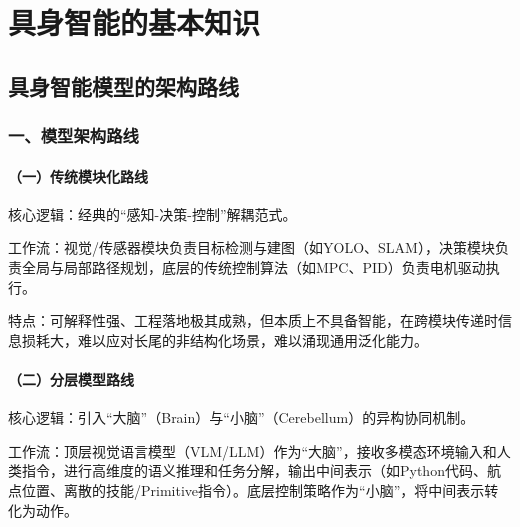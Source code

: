 \hypertarget{ux5177ux8eabux667aux80fdux7684ux57faux672cux77e5ux8bc6}{%
\chapter{具身智能的基本知识}\label{ux5177ux8eabux667aux80fdux7684ux57faux672cux77e5ux8bc6}}

\hypertarget{ux5177ux8eabux667aux80fdux6a21ux578bux7684ux67b6ux6784ux8defux7ebf}{%
\section{具身智能模型的架构路线}\label{ux5177ux8eabux667aux80fdux6a21ux578bux7684ux67b6ux6784ux8defux7ebf}}

\hypertarget{ux4e00ux6a21ux578bux67b6ux6784ux8defux7ebf}{%
\subsection{一、模型架构路线}\label{ux4e00ux6a21ux578bux67b6ux6784ux8defux7ebf}}

\hypertarget{ux4e00ux4f20ux7edfux6a21ux5757ux5316ux8defux7ebf}{%
\subsubsection{（一）传统模块化路线}\label{ux4e00ux4f20ux7edfux6a21ux5757ux5316ux8defux7ebf}}

核心逻辑：经典的``感知-决策-控制''解耦范式。

工作流：视觉/传感器模块负责目标检测与建图（如YOLO、SLAM），决策模块负责全局与局部路径规划，底层的传统控制算法（如MPC、PID）负责电机驱动执行。

特点：可解释性强、工程落地极其成熟，但本质上不具备智能，在跨模块传递时信息损耗大，难以应对长尾的非结构化场景，难以涌现通用泛化能力。

\hypertarget{ux4e8cux5206ux5c42ux6a21ux578bux8defux7ebf}{%
\subsubsection{（二）分层模型路线}\label{ux4e8cux5206ux5c42ux6a21ux578bux8defux7ebf}}

核心逻辑：引入``大脑''（Brain）与``小脑''（Cerebellum）的异构协同机制。

工作流：顶层视觉语言模型（VLM/LLM）作为``大脑''，接收多模态环境输入和人类指令，进行高维度的语义推理和任务分解，输出中间表示（如Python代码、航点位置、离散的技能/Primitive指令）。底层控制策略作为``小脑''，将中间表示转化为动作。

